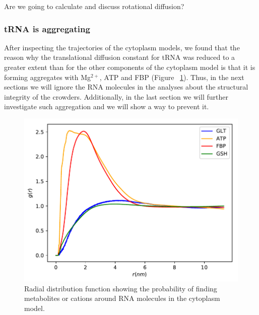 \documentclass[journal=jacsat,manuscript=article]{achemso}
\begin{document}
\colorbox{green!50}{ Are we going to calculate and discuss rotational diffusion? }










\subsubsection{tRNA is aggregating}
After inspecting the trajectories of the cytoplasm models, we found that the reason why the translational diffusion constant for tRNA was reduced to a greater extent than for the other components of the cytoplasm model is that it is forming aggregates with Mg$^{2+}$, ATP and FBP (Figure ~\ref{fig:tRNA_aggregation}). Thus, in the next sections we will ignore the RNA molecules in the analyses about the structural integrity of the crowders. Additionally, in the last section we will further investigate such aggregation and we will show a way to prevent it.

\begin{figure}[H]
\includegraphics[scale=0.5]{rdf_RNA_metabolites.pdf}
\caption{Radial distribution function showing the probability of finding metabolites or cations around RNA molecules in the cytoplasm model.}
\label{fig:tRNA_aggregation}
\end{figure}



\end{document}
